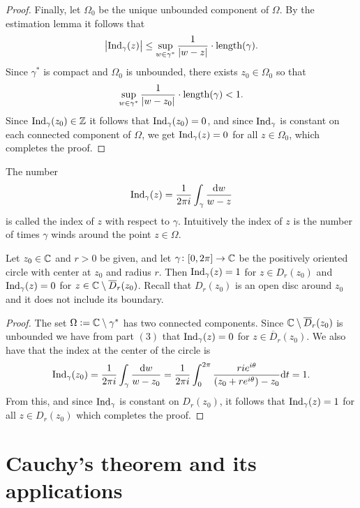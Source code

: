 \documentclass[11pt,a4paper]{article}
\begin{document}
\begin{proof}
  Finally, let $\Omega_0$ be the unique unbounded component of $\Omega$.
  By the estimation lemma it follows that
  \[
    \left\lvert\operatorname{Ind}_{\gamma}(z)\right\rvert \le
    \sup_{w \in \gamma^*} \frac{1}{|w - z|} \cdot \mathrm{length}(\gamma).
  \]
  Since $\gamma^*$ is compact and $\Omega_0$ is unbounded, there exists
  $z_0 \in \Omega_0$ so that
  \[
    \sup_{w \in \gamma^*} \frac{1}{|w - z_0|} \cdot \mathrm{length}(\gamma) < 1.
  \]
  Since $\operatorname{Ind}_{\gamma}(z_0) \in \mathbb{Z}$ it follows that $\operatorname{Ind}_{\gamma}(z_0) = 0$,
  and since $\operatorname{Ind}_{\gamma}$ is constant on each connected component of
  $\Omega$, we get $\operatorname{Ind}_{\gamma}(z) = 0$ for all $z \in \Omega_0$,
  which completes the proof.
\end{proof}

\begin{definition}
  The number
  \[
    \operatorname{Ind}_{\gamma}(z) = \frac{1}{2 \pi i} \int_{\gamma} \frac{\mathrm{d} w}{w - z}
  \]
  is called the index of $z$ with respect to $\gamma$.
  Intuitively the index of $z$ is the number of times $\gamma$ winds around
  the point $z \in \Omega$.
\end{definition}

\begin{proposition}
  Let $z_0 \in \mathbb{C}$ and $r > 0$ be given,
  and let $\gamma \colon [0,2 \pi] \to \mathbb{C}$ be the positively oriented circle
  with center at $z_0$ and radius $r$.
  Then $\operatorname{Ind}_{\gamma}(z) = 1$ for $z \in D_r(z_0)$ and
  $\operatorname{Ind}_{\gamma}(z) = 0$ for $z \in \mathbb{C} \setminus \overline D_r(z_0)$.
  Recall that $D_r(z_0)$ is an open disc around $z_0$ and it does not
  include its boundary.
\end{proposition}
\begin{proof}
  The set $\Omega := \mathbb{C} \setminus \gamma^*$ has two connected components.
  Since $\mathbb{C} \setminus \overline D_r(z_0)$ is unbounded we have from
   part $(3)$ that $\operatorname{Ind}_{\gamma}(z) = 0$ for
  $z \in \overline D_r(z_0)$.
  We also have that the index at the center of the circle is
  \[
    \operatorname{Ind}_{\gamma}(z_0) =
    \frac{1}{2 \pi i} \int_{\gamma} \frac{\mathrm{d} w}{w - z_0} =
    \frac{1}{2 \pi i} \int_{0}^{2 \pi}
    \frac{r i e^{i \theta}}{(z_0 + r e^{i \theta}) - z_0} \mathrm{d} t = 1.
  \]
  From this, and since $\operatorname{Ind}_{\gamma}$ is constant on $D_{r}(z_0)$,
  it follows that $\operatorname{Ind}_{\gamma}(z) =  1$ for all $z \in D_r(z_0)$
  which completes the proof.
\end{proof}


\newpage

\section{Cauchy's theorem and its applications}
\end{document}
